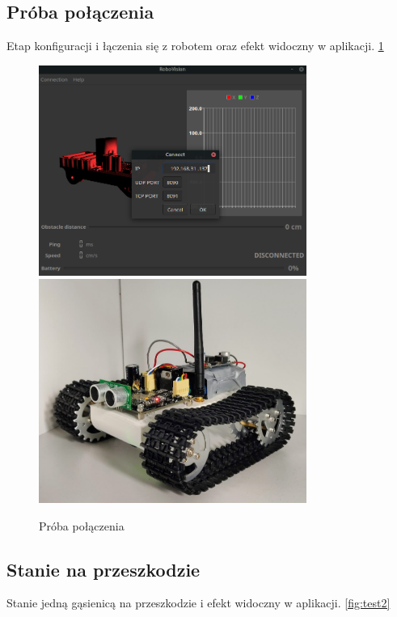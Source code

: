 \documentclass[12pt,a4paper,polish]{article}
\begin{document}
  \subsection{Próba połączenia}
  Etap konfiguracji i łączenia się z robotem oraz efekt widoczny w aplikacji. 
  \ref{fig:test1}

  \begin{figure}[ht]
    \centering
    \includegraphics[width=0.78\textwidth]{img/final/0.png}
    \includegraphics[width=0.78\textwidth]{img/final/0e.jpg}
    \caption{Próba połączenia}
    \label{fig:test1}
  \end{figure}


  \subsection{Stanie na przeszkodzie}
  Stanie jedną gąsienicą na przeszkodzie i efekt widoczny w aplikacji.
  \ref{fig:test2}
  
\end{document}

